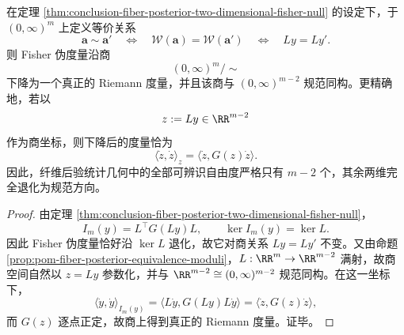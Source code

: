 \begin{corollary}\label{cor:conclusion-fiber-posterior-fisher-quotient-collapse}
在定理 \ref{thm:conclusion-fiber-posterior-two-dimensional-fisher-null} 的设定下，于 \((0,\infty)^m\) 上定义等价关系
\[
\boldsymbol a\sim \boldsymbol a'
\quad\Longleftrightarrow\quad
\mathcal W(\boldsymbol a)=\mathcal W(\boldsymbol a')
\quad\Longleftrightarrow\quad
Ly=Ly'.
\]
则 Fisher 伪度量沿商
\[
(0,\infty)^m/\!\sim
\]
下降为一个真正的 Riemann 度量，并且该商与 \((0,\infty)^{m-2}\) 规范同构。更精确地，若以
\[
z:=Ly\in\RR^{m-2}
\]
作为商坐标，则下降后的度量恰为
\[
\langle \dot z,\dot z\rangle_{z}= \langle \dot z,G(z)\dot z\rangle.
\]
因此，纤维后验统计几何中的全部可辨识自由度严格只有 \(m-2\) 个，其余两维完全退化为规范方向。
\end{corollary}
\begin{proof}
由定理 \ref{thm:conclusion-fiber-posterior-two-dimensional-fisher-null}，
\[
I_m(y)=L^\top G(Ly)L,
\qquad
\ker I_m(y)=\ker L.
\]
因此 Fisher 伪度量恰好沿 \(\ker L\) 退化，故它对商关系 \(Ly=Ly'\) 不变。又由命题 \ref{prop:pom-fiber-posterior-equivalence-moduli}，\(L:\RR^m\to\RR^{m-2}\) 满射，故商空间自然以 \(z=Ly\) 参数化，并与 \(\RR^{m-2}\cong (0,\infty)^{m-2}\) 规范同构。在这一坐标下，
\[
\langle \dot y,\dot y\rangle_{I_m(y)}
=
\langle L\dot y,G(Ly)L\dot y\rangle
=
\langle \dot z,G(z)\dot z\rangle,
\]
而 \(G(z)\) 逐点正定，故商上得到真正的 Riemann 度量。证毕。
\end{proof}

